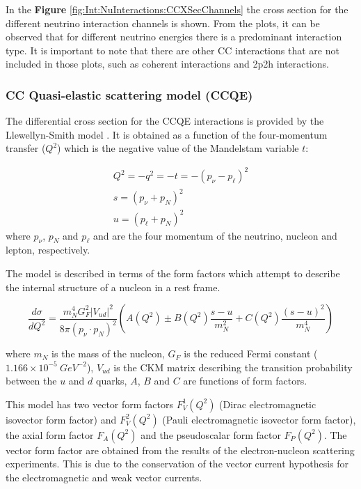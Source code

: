 In the \textbf{Figure} \ref{fig:Int:NuInteractions:CCXSecChannels} the cross section for the different neutrino interaction channels is shown. From the plots, it can be observed that for different neutrino energies there is a predominant interaction type. It is important to note that there are other CC interactions that are not included in those plots, such as coherent interactions and 2p2h interactions.  

\subsubsection{CC Quasi-elastic scattering model (CCQE)}
\label{Cap:Int:NuInteractions:CCQEmodel}
The differential cross section for the CCQE interactions is provided by the Llewellyn-Smith model \cite{LLEWELLYNSMITH1972261}. It is obtained as a function of the four-momentum transfer ($Q^2$) which is the negative value of the Mandelstam variable $t$: 

\begin{equation}
    \begin{split}
        Q^2 = -q^2 = -t = -(p_\nu - p_\ell)^2\\
        s = (p_\nu + p_N)^2 \\
        u = (p_\ell + p_N)^2
    \end{split}
\end{equation}
where $p_\nu$, $p_N$ and $p_\ell$ and are the four momentum of the neutrino, nucleon and lepton, respectively.

The model is described in terms of the form factors which attempt to describe the internal structure of a nucleon in a rest frame. 

\begin{equation}
    \frac{d\sigma}{dQ^2} = \frac{m^4_N G^2_F|V_{ud}|^2}{8\pi(p_\nu \cdot p_N)^2}\left(A(Q^2)\pm B(Q^2)\frac{s-u}{m^2_N}+C(Q^2)\frac{(s-u)^2}{m^4_N}\right)
\end{equation}

where $m_N$ is the mass of the nucleon, $G_F$ is the reduced Fermi constant ($1.166 \times 10^{−5}\ GeV^{−2}$), $V_{ud}$ is the CKM matrix describing the transition probability between the $u$ and $d$ quarks, $A$, $B$ and $C$ are functions of form factors. 

This model has two vector form factors $F^1_V (Q^2)$ (Dirac electromagnetic isovector form factor) and $F^2_V (Q^2)$ (Pauli electromagnetic isovector form factor), the axial form factor $F_A(Q^2)$ and the pseudoscalar form factor $F_P(Q^2)$. The vector form factor are obtained from the results of the electron-nucleon scattering experiments. This is due to the conservation of the vector current hypothesis for the electromagnetic and weak vector currents. 

